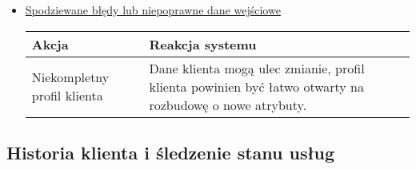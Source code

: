 \documentclass[a4paper,20pt]{article}
\begin{document}
\begin{itemize}
\begin{center}
\begin{tabularx}{\textwidth}[t]{XX}
\hline

\end{tabularx}
\end{center}


\item \underline{Spodziewane błędy lub niepoprawne dane wejściowe}


\begin{center}
\begin{tabular}{ | m{15em} | m{7cm} | } 
\hline
\textbf{Akcja} & \textbf{Reakcja systemu} \\ 
\hline
Niekompletny profil klienta & Dane klienta mogą ulec zmianie, profil klienta powinien być łatwo otwarty na rozbudowę o nowe atrybuty.  \\ 
\hline
\end{tabular}
\end{center}

\end{itemize}





\subsection{Historia klienta i śledzenie stanu usług}
\end{document}

